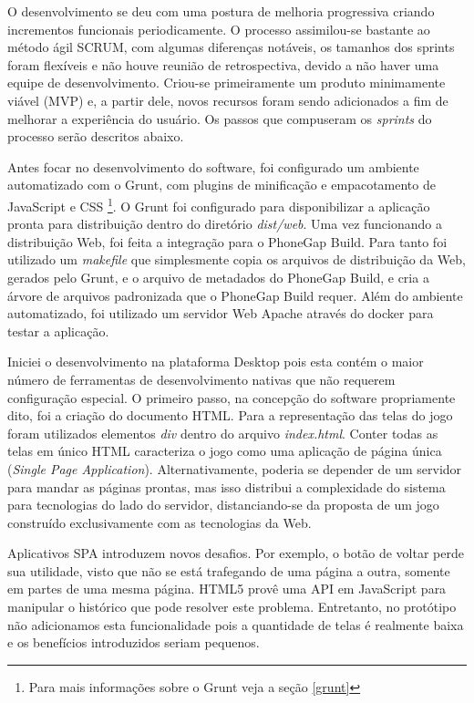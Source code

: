 O desenvolvimento se deu com uma postura de melhoria progressiva criando
incrementos funcionais periodicamente. O processo assimilou-se bastante
ao método ágil SCRUM, com algumas diferenças notáveis, os tamanhos dos sprints
foram flexíveis e não houve reunião de retrospectiva, devido a não
haver uma equipe de desenvolvimento. Criou-se primeiramente um produto
minimamente viável (MVP) e, a partir dele, novos recursos foram
sendo adicionados a fim de melhorar a experiência do usuário. Os 
passos que compuseram  os \textit{sprints} do processo serão descritos abaixo.

Antes focar no desenvolvimento do software, foi configurado um ambiente
automatizado com o Grunt, com plugins de minificação e empacotamento
de JavaScript e CSS \footnote{Para mais informações sobre o Grunt
veja a seção \ref{grunt}}. O Grunt foi configurado para disponibilizar a
aplicação pronta para distribuição dentro do diretório \textit{dist/web}.
Uma vez funcionando a distribuição Web, foi feita a integração para
o PhoneGap Build. Para tanto foi utilizado um \textit{makefile} que
simplesmente copia os arquivos de distribuição da Web, gerados pelo
Grunt, e o arquivo de metadados do PhoneGap Build, e cria a árvore de
arquivos padronizada que o PhoneGap Build requer. Além do ambiente
automatizado, foi utilizado um servidor Web Apache através do docker
para testar a aplicação.

Iniciei o desenvolvimento na plataforma Desktop pois esta contém
o maior número de ferramentas de desenvolvimento nativas que não
requerem configuração especial. O primeiro passo, na concepção
do software propriamente dito, foi a criação do documento HTML.
Para a representação das telas do jogo foram utilizados elementos
\textit{div} dentro do arquivo \textit{index.html}. Conter todas
as telas em único HTML caracteriza o jogo como uma aplicação de
página única (\textit{Single Page Application}). Alternativamente,
poderia se depender de um servidor para mandar as páginas prontas,
mas isso distribui a complexidade do sistema para tecnologias do
lado do servidor, distanciando-se da proposta de um jogo construído
exclusivamente com as tecnologias da Web.

Aplicativos SPA introduzem novos desafios. Por exemplo, o botão
de voltar perde sua utilidade, visto que não se está trafegando
de uma página a outra, somente em partes de uma mesma página. HTML5
provê uma API em JavaScript para manipular o histórico que pode
resolver este problema. Entretanto, no protótipo não adicionamos
esta funcionalidade pois a quantidade de telas é realmente baixa e os
benefícios introduzidos seriam pequenos.

